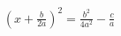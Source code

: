 \documentclass[preview]{standalone}
\begin{document}
\begin{align*}
\left( x + \frac{b}{2a} \right)^2 = \frac{b^2}{4a^2} - \frac{c}{a}
\end{align*}
\end{document}
